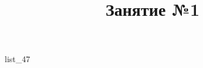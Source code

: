 \documentclass[12pt, a4paper]{article}
\begin{document}
	\title{Занятие №1}
	{list_47}
\end{document}
